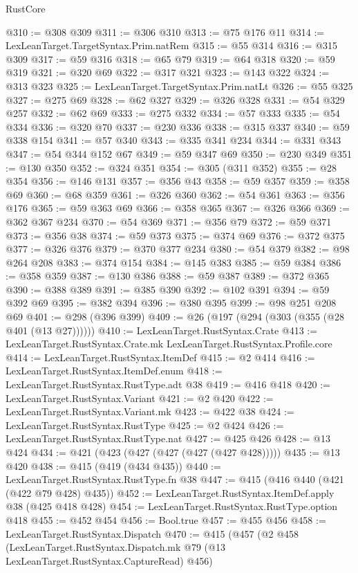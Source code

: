 \begin{lexlean}{RustCore}
\begin{coremodule}
@310 := @308 @309
@311 := @306 @310
@313 := @75 @176 @11
@314 := LexLeanTarget.TargetSyntax.Prim.natRem
@315 := @55 @314
@316 := @315 @309
@317 := @59 @316
@318 := @65 @79
@319 := @64 @318
@320 := @59 @319
@321 := @320 @69
@322 := @317 @321
@323 := @143 @322
@324 := @313 @323
@325 := LexLeanTarget.TargetSyntax.Prim.natLt
@326 := @55 @325
@327 := @275 @69
@328 := @62 @327
@329 := @326 @328
@331 := @54 @329 @257
@332 := @62 @69
@333 := @275 @332
@334 := @57 @333
@335 := @54 @334
@336 := @320 @70
@337 := @230 @336
@338 := @315 @337
@340 := @59 @338 @154
@341 := @57 @340
@343 := @335 @341 @234
@344 := @331 @343
@347 := @54 @344 @152 @67
@349 := @59 @347 @69
@350 := @230 @349
@351 := @130 @350
@352 := @324 @351
@354 := @305 (@311 @352)
@355 := @28 @354
@356 := @146 @131
@357 := @356 @43
@358 := @59 @357
@359 := @358 @69
@360 := @68 @359
@361 := @326 @360
@362 := @54 @361
@363 := @356 @176
@365 := @59 @363 @69
@366 := @358 @365
@367 := @326 @366
@369 := @362 @367 @234
@370 := @54 @369
@371 := @356 @79
@372 := @59 @371
@373 := @356 @38
@374 := @59 @373
@375 := @374 @69
@376 := @372 @375
@377 := @326 @376
@379 := @370 @377 @234
@380 := @54 @379
@382 := @98 @264 @208
@383 := @374 @154
@384 := @145 @383
@385 := @59 @384
@386 := @358 @359
@387 := @130 @386
@388 := @59 @387
@389 := @372 @365
@390 := @388 @389
@391 := @385 @390
@392 := @102 @391
@394 := @59 @392 @69
@395 := @382 @394
@396 := @380 @395
@399 := @98 @251 @208 @69
@401 := @298 (@396 @399)
@409 := @26 (@197 (@294 (@303 (@355 (@28 @401 (@13 @27))))))
@410 := LexLeanTarget.RustSyntax.Crate
@413 := LexLeanTarget.RustSyntax.Crate.mk LexLeanTarget.RustSyntax.Profile.core
@414 := LexLeanTarget.RustSyntax.ItemDef
@415 := @2 @414
@416 := LexLeanTarget.RustSyntax.ItemDef.enum
@418 := LexLeanTarget.RustSyntax.RustType.adt @38
@419 := @416 @418
@420 := LexLeanTarget.RustSyntax.Variant
@421 := @2 @420
@422 := LexLeanTarget.RustSyntax.Variant.mk
@423 := @422 @38
@424 := LexLeanTarget.RustSyntax.RustType
@425 := @2 @424
@426 := LexLeanTarget.RustSyntax.RustType.nat
@427 := @425 @426
@428 := @13 @424
@434 := @421 (@423 (@427 (@427 (@427 (@427 @428)))))
@435 := @13 @420
@438 := @415 (@419 (@434 @435))
@440 := LexLeanTarget.RustSyntax.RustType.fn @38
@447 := @415 (@416 @440 (@421 (@422 @79 @428) @435))
@452 := LexLeanTarget.RustSyntax.ItemDef.apply @38 (@425 @418 @428)
@454 := LexLeanTarget.RustSyntax.RustType.option @418
@455 := @452 @454
@456 := Bool.true
@457 := @455 @456
@458 := LexLeanTarget.RustSyntax.Dispatch
@470 := @415
    (@457
      (@2
        @458
        (LexLeanTarget.RustSyntax.Dispatch.mk @79 (@13 LexLeanTarget.RustSyntax.CaptureRead) @456)

\end{coremodule}
\end{lexlean}
